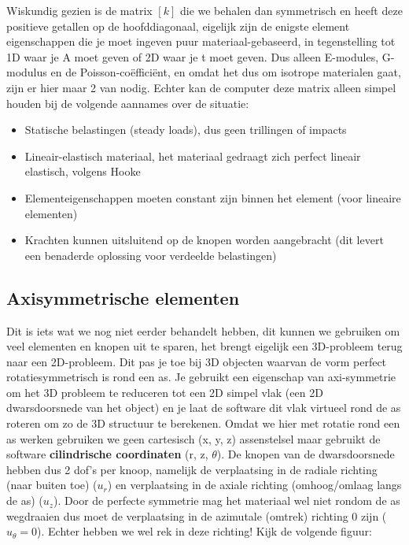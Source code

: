 \documentclass[a4paper,11pt,twoside]{report}
\begin{document}
Wiskundig gezien is de matrix $[k]$ die we behalen dan symmetrisch en heeft deze positieve getallen
op de hoofddiagonaal, eigelijk zijn de enigste element eigenschappen die je moet ingeven puur
materiaal-gebaseerd, in tegenstelling tot 1D waar je A moet geven of 2D waar je t moet geven. Dus
alleen E-modules, G-modulus en de Poisson-coëfficiënt, en omdat het dus om isotrope materialen gaat,
zijn er hier maar 2 van nodig. Echter kan de computer deze matrix alleen simpel houden bij de
volgende aannames over de situatie:
\begin{itemize}
    \item Statische belastingen (steady loads), dus geen trillingen of impacts
    \item Lineair-elastisch materiaal, het materiaal gedraagt zich perfect lineair elastisch,
          volgens Hooke
    \item Elementeigenschappen moeten constant zijn binnen het element (voor lineaire elementen)
    \item Krachten kunnen uitsluitend op de knopen worden aangebracht (dit levert een benaderde
          oplossing voor verdeelde belastingen)
\end{itemize}
\subsection{Axisymmetrische elementen}
Dit is iets wat we nog niet eerder behandelt hebben, dit kunnen we gebruiken om veel elementen en
knopen uit te sparen, het brengt eigelijk een 3D-probleem terug naar een 2D-probleem. Dit pas je toe
bij 3D objecten waarvan de vorm perfect rotatiesymmetrisch is rond een as. Je gebruikt een
eigenschap van axi-symmetrie om het 3D probleem te reduceren tot een 2D simpel vlak (een 2D
dwarsdoorsnede van het object) en je laat de software dit vlak virtueel rond de as roteren om zo de
3D structuur te berekenen.
\newline
\newline
Omdat we hier met rotatie rond een as werken gebruiken we geen cartesisch (x, y, z) assenstelsel
maar gebruikt de software \textbf{cilindrische coordinaten} (r, z, $\theta$). De knopen van de
dwarsdoorsnede hebben dus 2 dof's per knoop, namelijk de verplaatsing in de radiale richting (naar
buiten toe) ($u_r$) en verplaatsing in de axiale richting (omhoog/omlaag langs de as) ($u_z$). Door
de perfecte symmetrie mag het materiaal wel niet rondom de as wegdraaien dus moet de verplaatsing in
de azimutale (omtrek) richting 0 zijn ($\hat{u}_\theta = 0$).
\newline
\newline
Echter hebben we wel rek in deze richting! Kijk de volgende figuur:
\end{document}
